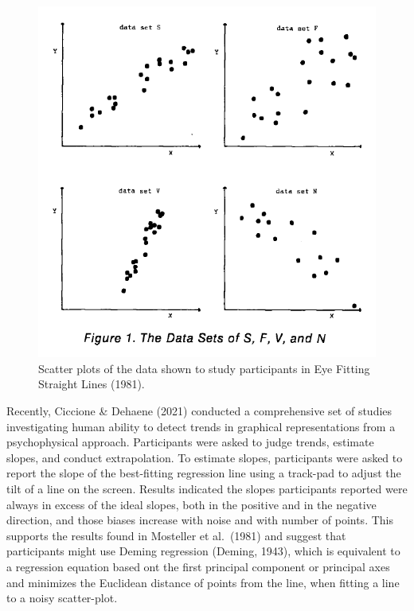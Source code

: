 \documentclass[print]{nuthesis}
\begin{document}
\begin{figure}[tbp]

{\centering \includegraphics[width=0.7\linewidth,]{images/02-you-draw-it/eyefitting-straight-lines-plots} 

}

\caption[Eye Fitting Straight Lines (1981) Data Sets]{Scatter plots of the data shown to study participants in Eye Fitting Straight Lines (1981).}\label{fig:mosteller-eyefitting-plot}
\end{figure}

Recently, Ciccione \& Dehaene (2021) conducted a comprehensive set of studies investigating human ability to detect trends in graphical representations from a psychophysical approach.
Participants were asked to judge trends, estimate slopes, and conduct extrapolation.
To estimate slopes, participants were asked to report the slope of the best-fitting regression line using a track-pad to adjust the tilt of a line on the screen.
Results indicated the slopes participants reported were always in excess of the ideal slopes, both in the positive and in the negative direction, and those biases increase with noise and with number of points.
This supports the results found in Mosteller et al.~(1981) and suggest that participants might use Deming regression (Deming, 1943), which is equivalent to a regression equation based ont the first principal component or principal axes and minimizes the Euclidean distance of points from the line, when fitting a line to a noisy scatter-plot.
\end{document}
